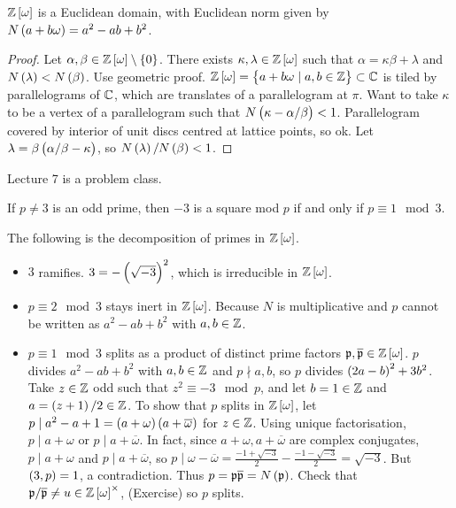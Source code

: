\begin{theorem}
$ \Z\sbr{\omega} $ is a Euclidean domain, with Euclidean norm given by $ N\br{a + b\omega} = a^2 - ab + b^2 $.
\end{theorem}

\begin{proof}
Let $ \alpha, \beta \in \Z\sbr{\omega} \setminus \cbr{0} $. There exists $ \kappa, \lambda \in \Z\sbr{\omega} $ such that $ \alpha = \kappa\beta + \lambda $ and $ N\br{\lambda} < N\br{\beta} $. Use geometric proof. $ \Z\sbr{\omega} = \cbr{a + b\omega \mid a, b \in \Z} \subset \C $ is tiled by parallelograms of $ \mathbb{C} $, which are translates of a parallelogram at $ \pi $. Want to take $ \kappa $ to be a vertex of a parallelogram such that $ N\br{\kappa - \alpha / \beta} < 1 $. Parallelogram covered by interior of unit discs centred at lattice points, so ok. Let $ \lambda = \beta\br{\alpha / \beta - \kappa} $, so $ N\br{\lambda} / N\br{\beta} < 1 $.
\end{proof}


Lecture 7 is a problem class.


\begin{lemma}
If $ p \ne 3 $ is an odd prime, then $ -3 $ is a square mod $ p $ if and only if $ p \equiv 1 \mod 3 $.
\end{lemma}

The following is the decomposition of primes in $ \Z\sbr{\omega} $.
\begin{itemize}
\item $ 3 $ ramifies. $ 3 = -\br{\sqrt{-3}}^2 $, which is irreducible in $ \Z\sbr{\omega} $.
\item $ p \equiv 2 \mod 3 $ stays inert in $ \Z\sbr{\omega} $. Because $ N $ is multiplicative and $ p $ cannot be written as $ a^2 - ab + b^2 $ with $ a, b \in \mathbb{Z} $.
\item $ p \equiv 1 \mod 3 $ splits as a product of distinct prime factors $ \pp, \overline{\pp} \in \Z\sbr{\omega} $. $ p $ divides $ a^2 - ab + b^2 $ with $ a, b \in \mathbb{Z} $ and $ p \nmid a, b $, so $ p $ divides $ \br{2a - b}^2 + 3b^2 $. Take $ z \in \mathbb{Z} $ odd such that $ z^2 \equiv -3 \mod p $, and let $ b = 1 \in \mathbb{Z} $ and $ a = \br{z + 1} / 2 \in \Z $. To show that $ p $ splits in $ \Z\sbr{\omega} $, let $ p \mid a^2 - a + 1 = \br{a + \omega}\br{a + \overline{\omega}} $ for $ z \in \mathbb{Z} $. Using unique factorisation, $ p \mid a + \omega $ or $ p \mid a + \overline{\omega} $. In fact, since $ a + \omega, a + \overline{\omega} $ are complex conjugates, $ p \mid a + \omega $ and $ p \mid a + \overline{\omega} $, so $ p \mid \omega - \overline{\omega} = \tfrac{-1 + \sqrt{-3}}{2} - \tfrac{-1 - \sqrt{-3}}{2} = \sqrt{-3} $. But $ \br{3, p} = 1 $, a contradiction. Thus $ p = \pp\overline{\pp} = N\br{\pp} $. Check that $ \pp / \overline{\pp} \ne u \in \Z\sbr{\omega}^\times $, (Exercise) so $ p $ splits.
\end{itemize}

